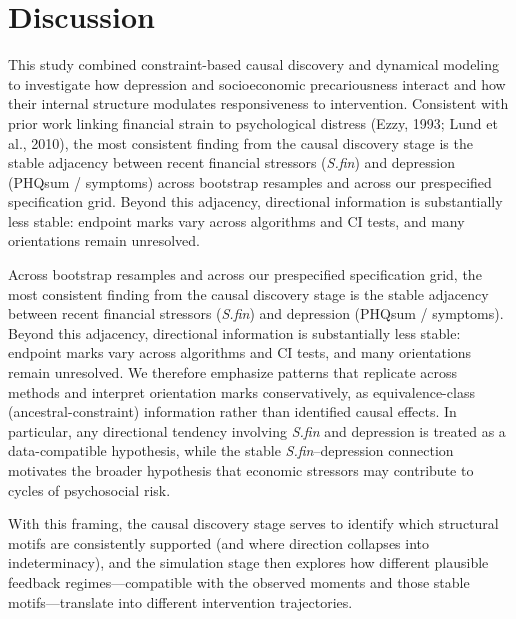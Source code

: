 \documentclass[
]{article}
\begin{document}
\restoregeometry

\section{Discussion}\label{discussion}

This study combined constraint-based causal discovery and dynamical
modeling to investigate how depression and socioeconomic precariousness
interact and how their internal structure modulates responsiveness to
intervention. Consistent with prior work linking financial strain to
psychological distress (Ezzy, 1993; Lund et al., 2010), the most
consistent finding from the causal discovery stage is the stable
adjacency between recent financial stressors (\textit{S.fin}) and
depression (PHQsum / symptoms) across bootstrap resamples and across our
prespecified specification grid. Beyond this adjacency, directional
information is substantially less stable: endpoint marks vary across
algorithms and CI tests, and many orientations remain unresolved.

Across bootstrap resamples and across our prespecified specification
grid, the most consistent finding from the causal discovery stage is the
stable adjacency between recent financial stressors (\textit{S.fin}) and
depression (PHQsum / symptoms). Beyond this adjacency, directional
information is substantially less stable: endpoint marks vary across
algorithms and CI tests, and many orientations remain unresolved. We
therefore emphasize patterns that replicate across methods and interpret
orientation marks conservatively, as equivalence-class
(ancestral-constraint) information rather than identified causal
effects. In particular, any directional tendency involving
\textit{S.fin} and depression is treated as a data-compatible
hypothesis, while the stable \textit{S.fin}--depression connection
motivates the broader hypothesis that economic stressors may contribute
to cycles of psychosocial risk.

With this framing, the causal discovery stage serves to identify which
structural motifs are consistently supported (and where direction
collapses into indeterminacy), and the simulation stage then explores
how different plausible feedback regimes---compatible with the observed
moments and those stable motifs---translate into different intervention
trajectories.
\end{document}

